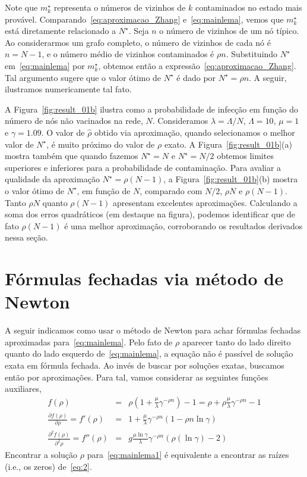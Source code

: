 		Note que  $m_{k}^{\star}$ representa o números de vizinhos de $k$  contaminados no estado mais provável. Comparando~\eqref{eq:aproximacao_Zhang} e~\eqref{eq:mainlema}, vemos que $m_{k}^{\star}$ está  diretamente relacionado a $N^{\star}$.  
		Seja $n$ o número de vizinhos de um nó típico.  Ao considerarmos um  grafo completo, o número de vizinhos de cada nó é $n=N-1$, e o número médio de vizinhos contaminados é $\rho n$.  Substituindo $N^{\star}$ em~\eqref{eq:mainlema} por $m_k^{\star}$,  obtemos então a expressão~\eqref{eq:aproximacao_Zhang}.
		Tal argumento sugere que o valor ótimo de $N^{\star}$ é dado por $N^{\star}=\hat{\rho}  n$.   A seguir, ilustramos numericamente tal fato.

		A Figura~\ref{fig:result_01b} ilustra como  a probabilidade de infecção  em função do número de nós não vacinados na rede, $N$. Consideramos $\lambda=\Lambda/N$, $\Lambda=10$, $\mu=1$ e $\gamma=1.09$.   O valor de $\hat{\rho}$ obtido via aproximação, quando selecionamos o melhor valor de $N^{\star}$, é muito próximo do valor de $\rho$ exato.  A Figura~\ref{fig:result_01b}(a) mostra também que quando fazemos $N^{\star}=N$ e $N^{\star}=N/2$ obtemos limites superiores e inferiores para a probabilidade de contaminação. Para avaliar a qualidade da aproximação $N^{\star}=\rho (N-1)$, a Figura~\ref{fig:result_01b}(b) mostra o valor ótimo de $N^{\star}$, em função de $N$, comparado com $N/2$, $\rho N$ e $\rho (N-1)$. Tanto $\rho N$ quanto $\rho (N-1)$ apresentam excelentes aproximações.  Calculando a soma dos erros quadráticos (em destaque na figura), podemos identificar que de fato $\rho(N-1)$ é uma melhor aproximação, corroborando os resultados derivados nessa seção. 
		

    \section{Fórmulas fechadas via método de Newton}
    \label{sec:fechadageral}
    	A seguir indicamos como usar o método de Newton para achar fórmulas fechadas aproximadas para~\eqref{eq:mainlema}.
	    Pelo fato de $\rho$ aparecer tanto do lado direito quanto do lado esquerdo de~\eqref{eq:mainlema}, a equação não é passível de solução exata em fórmula fechada.  Ao invés de buscar por soluções exatas, buscamos então por aproximações. Para tal, vamos considerar as seguintes funções auxiliares, 
    	\begin{eqnarray}
    		f(\rho)		&=& 	\rho \left( 1 + \frac{\mu}{\lambda}\gamma^{-\rho n} \right) -1  =  
    							\rho + \rho \frac{\mu}{\lambda} \gamma^{-\rho n} -1 \label{eq:2} \\
    		\frac{ \partial{f(\rho)}}{ \partial \rho}  = 
    		f'(\rho)	&= &	1 + \frac{\mu}{\lambda} \gamma^{-\rho n} 
    							\left( 1 - \rho n \ln \gamma \right)  \label{eq:3} \\
    		\frac{\partial^2{f(\rho)}}{ \partial^2 \rho}  = 
    		f''(\rho)	&= & 	g \frac{\mu \ln \gamma}{\lambda} \gamma^{-\rho n} 
    							\left( \rho (\ln \gamma) -2 \right)  \label{eq:4}
    	\end{eqnarray}
    	Encontrar a solução $\rho$ para~\eqref{eq:mainlema1} é equivalente a encontrar as raízes (i.e., os zeros) de~\eqref{eq:2}.

